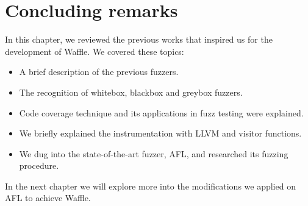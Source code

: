 \newpage
\section{Concluding remarks}

In this chapter, we reviewed the previous works that inspired us for the development of Waffle. We covered these topics:

\begin{itemize}
    \item A brief description of the previous fuzzers.
    \item The recognition of whitebox, blackbox and greybox fuzzers.
    \item Code coverage technique and its applications in fuzz testing were explained.
    \item We briefly explained the instrumentation with LLVM and visitor functions.
    \item We dug into the state-of-the-art fuzzer, AFL, and researched its fuzzing procedure.
\end{itemize}

In the next chapter we will explore more into the modifications we applied on AFL to achieve Waffle.